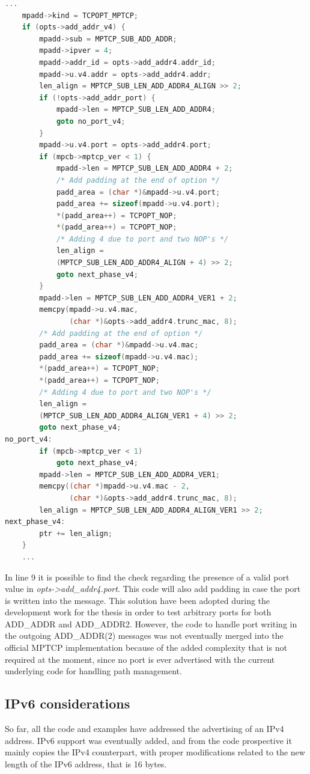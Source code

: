 \begin{lstlisting}[language=c, caption=Code to build the outgoing ADD\_ADDR(2) packet with added support for the port value, label=outport]
	...
	mpadd->kind = TCPOPT_MPTCP;
	if (opts->add_addr_v4) {
		mpadd->sub = MPTCP_SUB_ADD_ADDR;
		mpadd->ipver = 4;
		mpadd->addr_id = opts->add_addr4.addr_id;
		mpadd->u.v4.addr = opts->add_addr4.addr;
		len_align = MPTCP_SUB_LEN_ADD_ADDR4_ALIGN >> 2;
		if (!opts->add_addr_port) {
			mpadd->len = MPTCP_SUB_LEN_ADD_ADDR4;
			goto no_port_v4;
		}
		mpadd->u.v4.port = opts->add_addr4.port;
		if (mpcb->mptcp_ver < 1) {
			mpadd->len = MPTCP_SUB_LEN_ADD_ADDR4 + 2;
			/* Add padding at the end of option */
			padd_area = (char *)&mpadd->u.v4.port;
			padd_area += sizeof(mpadd->u.v4.port);
			*(padd_area++) = TCPOPT_NOP;
			*(padd_area++) = TCPOPT_NOP;
			/* Adding 4 due to port and two NOP's */
			len_align =
			(MPTCP_SUB_LEN_ADD_ADDR4_ALIGN + 4) >> 2;
			goto next_phase_v4;
		}
		mpadd->len = MPTCP_SUB_LEN_ADD_ADDR4_VER1 + 2;
		memcpy(mpadd->u.v4.mac,
		       (char *)&opts->add_addr4.trunc_mac, 8);
		/* Add padding at the end of option */
		padd_area = (char *)&mpadd->u.v4.mac;
		padd_area += sizeof(mpadd->u.v4.mac);
		*(padd_area++) = TCPOPT_NOP;
		*(padd_area++) = TCPOPT_NOP;
		/* Adding 4 due to port and two NOP's */
		len_align =
		(MPTCP_SUB_LEN_ADD_ADDR4_ALIGN_VER1 + 4) >> 2;
		goto next_phase_v4;
no_port_v4:
		if (mpcb->mptcp_ver < 1)
			goto next_phase_v4;
		mpadd->len = MPTCP_SUB_LEN_ADD_ADDR4_VER1;
		memcpy((char *)mpadd->u.v4.mac - 2,
		       (char *)&opts->add_addr4.trunc_mac, 8);
		len_align = MPTCP_SUB_LEN_ADD_ADDR4_ALIGN_VER1 >> 2;
next_phase_v4:
		ptr += len_align;
	}
	...
\end{lstlisting}

In line 9 it is possible to find the check regarding the presence of a valid port value in \textit{opts->add\_addr4.port}. This code will also add padding in case the port is written into the message. This solution have been adopted during the development work for the thesis in order to test arbitrary ports for both ADD\_ADDR and ADD\_ADDR2. However, the code to handle port writing in the outgoing ADD\_ADDR(2) messages was not eventually merged into the official MPTCP implementation because of the added complexity that is not required at the moment, since no port is ever advertised with the current underlying code for handling path management.

\subsection{IPv6 considerations}
So far, all the code and examples have addressed the advertising of an IPv4 address. IPv6 support was eventually added, and from the code prospective it mainly copies the IPv4 counterpart, with proper modifications related to the new length of the IPv6 address, that is 16 bytes. 

